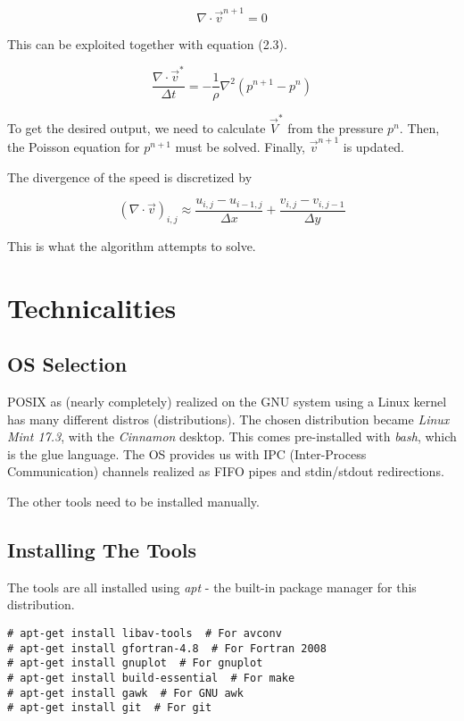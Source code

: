 \documentclass[listof=totoc]{report}
\begin{document}
$$ \nabla \cdot \vec{v}^{n+1} = 0 $$

This can be exploited together with equation (2.3).

\begin{equation}
\frac{\nabla \cdot \vec{v}^*}{\Delta t} = -\frac{1}{\rho} \nabla^2 (p^{n+1} - p^{n})
\end{equation}

To get the desired output, we need to calculate $\vec{V}^*$ from the pressure $p^n$.
Then, the Poisson equation for $p^{n+1}$ must be solved.
Finally, $\vec{v}^{n+1}$ is updated.

The divergence of the speed is discretized by

$$ (\nabla \cdot \vec{v})_{i,j} \approx \frac{u_{i,j} - u_{i-1,j}}{\Delta x} + \frac{v_{i,j} - v_{i,j-1}}{\Delta y} $$

This is what the algorithm attempts to solve.


\chapter{Technicalities}
\section{OS Selection}
POSIX as (nearly completely) realized on the GNU system using a Linux kernel has many different distros (distributions). The chosen distribution became \emph{Linux Mint 17.3}, with the \emph{Cinnamon} desktop. This comes pre-installed with \emph{bash}, which is the glue language. The OS provides us with IPC (Inter-Process Communication) channels realized as FIFO pipes and stdin/stdout redirections.

The other tools need to be installed manually.

\section{Installing The Tools}
The tools are all installed using \emph{apt} - the built-in package manager for this distribution.

\begin{verbatim}
# apt-get install libav-tools  # For avconv
# apt-get install gfortran-4.8  # For Fortran 2008
# apt-get install gnuplot  # For gnuplot
# apt-get install build-essential  # For make
# apt-get install gawk  # For GNU awk
# apt-get install git  # For git
\end{verbatim}
\end{document}
